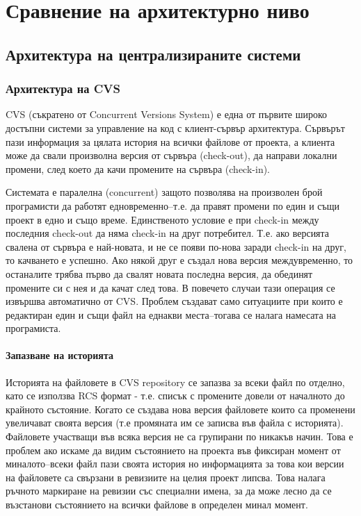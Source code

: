 \documentclass[a4paper]{article}
\begin{document}
\section{Сравнение на архитектурно ниво}
  \subsection{Архитектура на централизираните системи}
    \subsubsection{Архитектура на CVS}

    CVS (съкратено от Concurrent Versions System) е една от първите широко
    достъпни системи за управление на код с клиент-сървър архитектура. Сървърът
    пази информация за цялата история на всички файлове от проекта, а клиента
    може да свали произволна версия от сървъра (check-out), да направи локални
    промени, след което да качи промените на сървъра (check-in).

    Системата е паралелна (concurrent) защото позволява на произволен брой
    програмисти да работят едновременно--т.е. да правят промени по един и същи
    проект в едно и също време. Единственото условие е при check-in между
    последния check-out да няма check-in на друг потребител. Т.е. ако версията
    свалена от сървъра е най-новата, и не се появи по-нова заради check-in на
    друг, то качването е успешно. Ако някой друг е създал нова версия
    междувременно, то останалите трябва първо да свалят новата последна версия,
    да обединят промените си с нея и да качат след това. В повечето случаи тази
    операция се извършва автоматично от CVS. Проблем създават само ситуациите
    при които е редактиран един и същи файл на еднакви места--тогава се налага
    намесата на програмиста.

      \paragraph{Запазване на историята}

      Историята на файловете в CVS repository се запазва за всеки файл по
      отделно, като се използва RCS формат - т.е. списък с промените довели от
      началното до крайното състояние. Когато се създава нова версия файловете
      които са променени увеличават своята версия (т.е промяната им се записва
      във файла с историята). Файловете участващи във всяка версия не са
      групирани по никакъв начин. Това е проблем ако искаме да видим
      състоянието на проекта във фиксиран момент от миналото--всеки файл пази
      своята история но информацията за това кои версии на файловете са
      свързани в ревизиите на целия проект липсва. Това налага ръчното
      маркиране на ревизии със специални имена, за да може лесно да се
      възстанови състоянието на всички файлове в определен минал момент.
\end{document}
